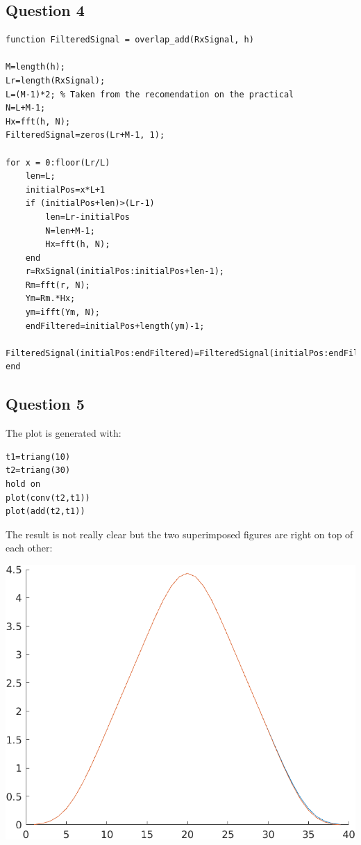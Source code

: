 \documentclass[conference,9pt]{IEEEtran}
\begin{document}
\subsection{Question 4}
\begin{verbatim}
function FilteredSignal = overlap_add(RxSignal, h)

M=length(h);
Lr=length(RxSignal);
L=(M-1)*2; % Taken from the recomendation on the practical
N=L+M-1;
Hx=fft(h, N);
FilteredSignal=zeros(Lr+M-1, 1);

for x = 0:floor(Lr/L)
    len=L;
    initialPos=x*L+1
    if (initialPos+len)>(Lr-1)
        len=Lr-initialPos
        N=len+M-1;
        Hx=fft(h, N);
    end
    r=RxSignal(initialPos:initialPos+len-1);
    Rm=fft(r, N);
    Ym=Rm.*Hx;
    ym=ifft(Ym, N);
    endFiltered=initialPos+length(ym)-1;
    FilteredSignal(initialPos:endFiltered)=FilteredSignal(initialPos:endFiltered)+ym;
end
\end{verbatim}

\subsection{Question 5}
The plot is generated with:
\begin{verbatim}
t1=triang(10)
t2=triang(30)
hold on
plot(conv(t2,t1))
plot(add(t2,t1))
\end{verbatim}

The result is not really clear but the two superimposed figures are right on top of each other:

\includegraphics[scale=0.6]{comp}
\end{document}
